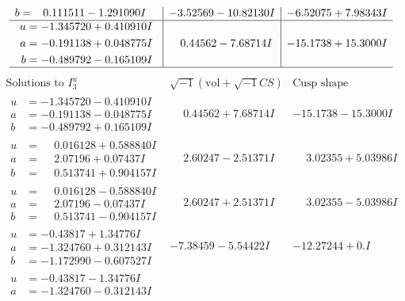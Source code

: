 \documentclass[1p]{elsarticle_modified}
\theoremstyle{definition}
\newcommand{\I}{\sqrt{-1}}
\begin{document}
$$\begin{array}{c|c|c}
\begin{aligned}
b &= \phantom{-}0.111511 - 1.291090 I\end{aligned}
 & -3.52569 - 10.82130 I & -6.52075 + 7.98343 I \\ \hline\begin{aligned}
u &= -1.345720 + 0.410910 I \\
a &= -0.191138 + 0.048775 I \\
b &= -0.489792 - 0.165109 I\end{aligned}
 & \phantom{-}0.44562 - 7.68714 I & -15.1738 + 15.3000 I\\
 \hline 
 \end{array}$$\newpage$$\begin{array}{c|c|c}  
\text{Solutions to }I^u_{3}& \I (\text{vol} + \sqrt{-1}CS) & \text{Cusp shape}\\
 \hline 
\begin{aligned}
u &= -1.345720 - 0.410910 I \\
a &= -0.191138 - 0.048775 I \\
b &= -0.489792 + 0.165109 I\end{aligned}
 & \phantom{-}0.44562 + 7.68714 I & -15.1738 - 15.3000 I \\ \hline\begin{aligned}
u &= \phantom{-}0.016128 + 0.588840 I \\
a &= \phantom{-}2.07196 + 0.07437 I \\
b &= \phantom{-}0.513741 + 0.904157 I\end{aligned}
 & \phantom{-}2.60247 - 2.51371 I & \phantom{-}3.02355 + 5.03986 I \\ \hline\begin{aligned}
u &= \phantom{-}0.016128 - 0.588840 I \\
a &= \phantom{-}2.07196 - 0.07437 I \\
b &= \phantom{-}0.513741 - 0.904157 I\end{aligned}
 & \phantom{-}2.60247 + 2.51371 I & \phantom{-}3.02355 - 5.03986 I \\ \hline\begin{aligned}
u &= -0.43817 + 1.34776 I \\
a &= -1.324760 + 0.312143 I \\
b &= -1.172990 - 0.607527 I\end{aligned}
 & -7.38459 - 5.54422 I & -12.27244 + 0. I\phantom{ +0.000000I} \\ \hline\begin{aligned}
u &= -0.43817 - 1.34776 I \\
a &= -1.324760 - 0.312143 I \\

\end{aligned}
\end{array}$$
\end{document}

